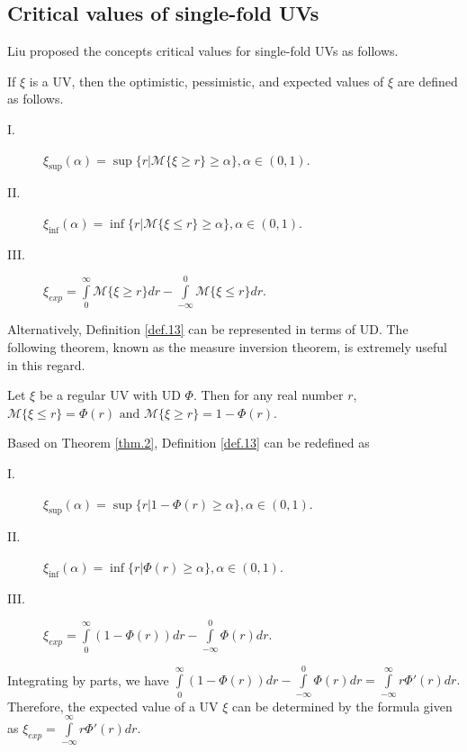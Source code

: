 	\subsection{Critical values of single-fold UVs} Liu \cite{Liu 2015} proposed the concepts critical values for single-fold UVs as follows.
	\begin{definition}\cite{Liu 2015}\label{def.13}
		If $\xi$ is a UV, then the optimistic, pessimistic, and expected values of $\xi$ are defined as follows.
		\begin{description}
			\item[ I.]  $\xi_{\sup}(\alpha)=\sup\{r|\mathcal{M}\{\xi\geq r\}\geq \alpha\},\alpha\in (0,1).$
			\item[ II.]  $\xi_{\inf}(\alpha)=\inf\{r|\mathcal{M}\{\xi\leq r\}\geq \alpha\},\alpha\in (0,1).$
			\item[ III.]  $\xi_{exp}=\int\limits_{0}^{\infty}\mathcal{M}\{\xi\geq r\}dr-
			\int\limits_{-\infty}^{0}\mathcal{M}\{\xi\leq r\}dr.$
		\end{description}
	\end{definition} 
\par Alternatively, Definition \ref{def.13} can be represented in terms of UD. The following theorem, known as the measure inversion theorem, is extremely useful in this regard.
\begin{theorem}\cite{Liu 2015}\label{thm.2}
Let $\xi$ be a regular UV with UD $\Phi$. Then for any real number $r$, $\mathcal{M}\{\xi\leq r\}=\Phi(r)\text{ and } \mathcal{M}\{\xi\geq r\}=1-\Phi(r).$
\end{theorem}
\par Based on Theorem \ref{thm.2}, Definition \ref{def.13} can be redefined as
\begin{description}
	\item[ I.]  $\xi_{\sup}(\alpha)=\sup\{r|1-\Phi(r)\geq \alpha\},\alpha\in (0,1).$
	\item[ II.]  $\xi_{\inf}(\alpha)=\inf\{r|\Phi(r)\geq \alpha\},\alpha\in (0,1).$
	\item[ III.]  $\xi_{exp}=\int\limits_{0}^{\infty}(1-\Phi(r))dr-
	\int\limits_{-\infty}^{0}\Phi(r)dr.$
\end{description}
\begin{remark}
	Integrating by parts, we have 
	$\int\limits_{0}^{\infty}(1-\Phi(r))dr-
	\int\limits_{-\infty}^{0}\Phi(r)dr=\int\limits_{-\infty}^{\infty}r{\Phi}'(r)dr.$ Therefore, the expected value of a UV $\xi$ can be determined by the formula given as $\xi_{exp}=\int\limits_{-\infty}^{\infty}r{\Phi}'(r)dr.$ 
	\end{remark}
